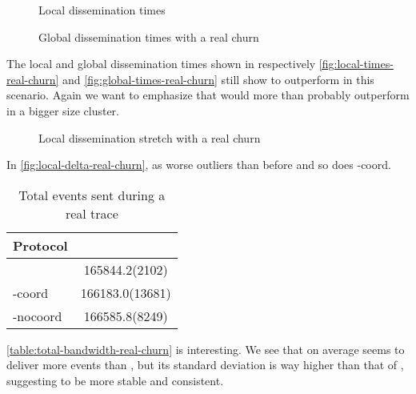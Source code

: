 \begin{figure}[hpt]
	\centering
	
	\vspace{-2mm} 
	\caption{Local dissemination times}
	\vspace{-2mm}
	\label{fig:local-times-real-churn} 
\end{figure}
\begin{figure}[hpt]
	\centering
	
	\vspace{-2mm} 
	\caption{Global dissemination times with a real churn}
	\vspace{-2mm} 
	\label{fig:global-times-real-churn} 
\end{figure}
The local and global dissemination times shown in respectively \autoref{fig:local-times-real-churn} and \autoref{fig:global-times-real-churn} still show \jgroups to outperform \epto in this scenario. Again we want to emphasize that \epto would more than probably outperform \jgroups in a bigger size cluster.
\par
\begin{figure}[hpt]
	\centering
	
	\vspace{-2mm} 
	\caption{Local dissemination stretch with a real churn}
	\vspace{-2mm}
	\label{fig:local-delta-real-churn}   
\end{figure}
In \autoref{fig:local-delta-real-churn}, \epto as worse outliers than before and so does \jgroups-coord.
\begin{table}[hpt]
	\centering
	\caption{Total events sent during a real trace}
\begin{tabular}{lS}
	\toprule
	Protocol &\\
	\midrule
	\epto & 165844.2(2102)\\
	\jgroups-coord & 166183.0(13681)\\
	\jgroups-nocoord & 166585.8(8249)\\
	\bottomrule
\end{tabular}
    \label{table:total-sent-real-churn}
\end{table}
\autoref{table:total-bandwidth-real-churn} is interesting. We see that on average \jgroups seems to deliver more events than \epto, but its standard deviation is way higher than that of \epto, suggesting \epto to be more stable and consistent.
%	
